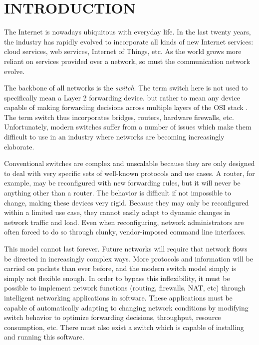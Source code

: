 \chapter{INTRODUCTION} \label{ch:intro}

%
%


The Internet is nowadays ubiquitous with everyday life. In the last twenty
years,
the industry has rapidly evolved to incorporate all kinds of new Internet
services:
cloud services, web services, Internet of Things, etc. As the world grows
more reliant on services provided over a network, so must the communication network evolve.

The backbone of all networks is the \emph{switch}. The term switch here is not used to specifically mean a Layer 2 forwarding device. but rather to mean any device capable of making forwarding decisions across multiple layers of the OSI stack \cite{osi_model}. The term switch thus incorporates bridges, routers, hardware firewalls, etc.
Unfortunately, modern switches suffer from a number of issues which make them difficult to use in an industry where networks are becoming increasingly elaborate.

Conventional switches are complex and unscalable because they are only designed to deal with very specific sets of well-known protocols and use cases. A router, for example, may be reconfigured with new forwarding rules, but it will never be anything other than a router. The behavior is difficult if not impossible to change, making these devices very rigid.
Because they may only be reconfigured within a limited use case, they cannot easily adapt to dynamic changes in network traffic and load.
Even when reconfiguring, network administrators are often forced to do so through clunky, vendor-imposed command line interfaces. 

This model cannot last forever. Future networks will require that network flows be directed in increasingly complex ways. More protocols and information will be carried on packets than ever before, and the modern switch model simply is simply not flexible enough.
In order to bypass this inflexibility, it must be possible to implement network functions (routing, firewalls, NAT, etc) through intelligent networking applications in software.
These applications must be capable of automatically adapting to changing network conditions by modifying switch behavior to optimize forwarding decisions, throughput, resource consumption, etc.
There must also exist a switch which is capable of installing and running this software.

